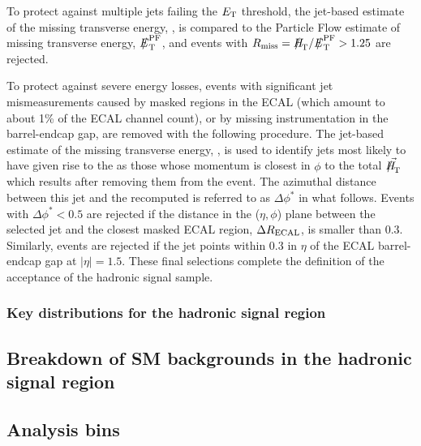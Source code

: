To protect against multiple jets failing the ${E_{\text T}}$ threshold, the
jet-based estimate of the missing transverse energy, \mht, is compared
to the Particle Flow estimate of missing transverse energy, $\pfmet$,
and events with $R_{\rm miss}=\mht/\pfmet > 1.25$ are rejected.

To protect against severe energy losses, events with significant jet
mismeasurements caused by masked regions in the ECAL (which amount to
about 1\% of the ECAL channel count), or by missing instrumentation in
the barrel-endcap gap, are removed with the following procedure. The
jet-based estimate of the missing transverse energy, \mht, is used to
identify jets most likely to have given rise to the \mht as those
whose momentum is closest in $\phi$ to the total $\vec{\mht}$ which
results after removing them from the event.  The azimuthal distance
between this jet and the recomputed \mht is referred to as
$\Delta\phi^*$ in what follows. Events with $\Delta\phi^* < 0.5$ are
rejected if the distance in the ($\eta,\phi$) plane between the
selected jet and the closest masked ECAL region, $\Delta R_{\rm
  ECAL}$, is smaller than 0.3. Similarly, events are rejected if the
jet points within 0.3 in $\eta$ of the ECAL barrel-endcap gap at
$|\eta| = 1.5$. These final selections complete the definition of the
acceptance of the hadronic signal sample.


\subsubsection{Key distributions for the hadronic signal
  region\label{sec:mc-data-comp}}

\subsection{Breakdown of SM backgrounds in the hadronic signal
  region\label{sec:bkgd-comp}}


\subsection{Analysis bins}

